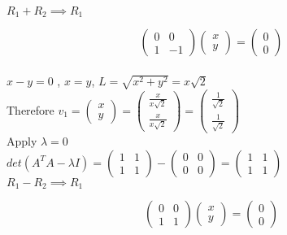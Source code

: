 \documentclass[12pt, oneside]{article}   	%
\begin{document}
\begin{enumerate}
	$R_1 + R_2 \implies R_1$
	
	
	$$\left( \begin{array}{cc} 0 & 0 \\ 1 & -1  \end{array} \right) \left( \begin{array}{c} x \\ y \end{array} \right) =\left( \begin{array}{c} 0 \\ 0  \end{array} \right)$$ \\
	
	$x-y=0$ , $x=y$, $L=\sqrt{x^2+y^2}= x\sqrt{2}$\\ 
	Therefore $v_1= \left( \begin{array}{c} x \\ y  \end{array} \right)=\left( \begin{array}{c} \frac{x}{x\sqrt{2}} \\ \frac{x}{x\sqrt{2}} \end{array} \right) = \left( \begin{array}{c} \frac{1}{\sqrt{2}} \\ \frac{1}{\sqrt{2}} \end{array} \right)$\\
	
	Apply $\lambda= 0$\\
	
	$det(A^TA- \lambda I)= \left( \begin{array}{cc} 1 & 1 \\ 1 & 1  \end{array} \right)- \left( \begin{array}{cc} 0 & 0 \\ 0 & 0  \end{array} \right) =\left( \begin{array}{cc} 1 & 1 \\ 1 & 1  \end{array} \right)$\\
	
	$R_1 - R_2 \implies R_1$
	
	
	$$\left( \begin{array}{cc} 0 & 0 \\ 1 & 1  \end{array} \right) \left( \begin{array}{c} x \\ y \end{array} \right) =\left( \begin{array}{c} 0 \\ 0  \end{array} \right)$$ \\
	

\end{enumerate}
\end{document}
